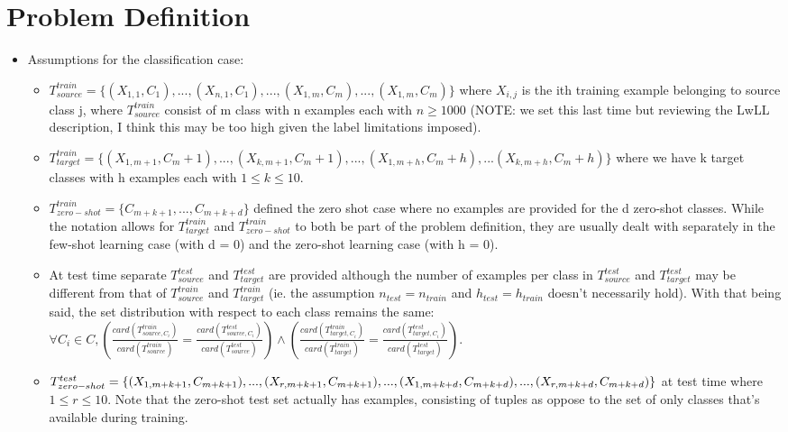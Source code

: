\documentclass{article}
\begin{document}
\section{Problem Definition}
\begin{itemize}
        \item Assumptions for the classification case:
        \begin{itemize}
            \item $T_{source}^{train} = \{ (X_{1,1}, C_1), ... , (X_{n,1}, C_1), ... ,(X_{1,m}, C_m) , ... ,(X_{1,m}, C_m)\}$ where $X_{i,j}$ is the ith training example belonging to source class j, where $T_{source}^{train}$ consist of m class with n examples each with $n \ge 1000$ (NOTE: we set this last time but reviewing the LwLL description, I think this may be too high given the label limitations imposed).
            \item $T_{target}^{train} = \{ (X_{1,m+1}, C_m+1),...,(X_{k,m+1}, C_m+1), ..., (X_{1,m+h}, C_m+h),...(X_{k,m+h}, C_m+h) \}$ where we have k target classes with h examples each with $1 \leq k \leq 10$.
            \item $T_{zero-shot}^{train} = \{ C_{m+k+1}, ..., C_{m+k+d} \}$ defined the zero shot case where no examples are provided for the d zero-shot classes. While the notation allows for $T_{target}^{train}$ and $T_{zero-shot}^{train}$ to both be part of the problem definition, they are usually dealt with separately in the few-shot learning case (with d = 0) and the zero-shot learning case (with h = 0).
            \item At test time separate $T_{source}^{test}$ and  $T_{target}^{test}$ are provided although the number of examples per class in $T_{source}^{test}$ and $T_{target}^{test}$ may be different from that of $T_{source}^{train}$ and $T_{target}^{train}$ (ie. the assumption $n_{test} = n_{train}$ and $h_{test} = h_{train}$ doesn't necessarily hold). With that being said, the set distribution with respect to each class remains the same: $\forall C_i \in C, (\frac{card(T_{source,C_i}^{train})} {card(T_{source}^{train})} = \frac{card(T_{source,C_i}^{test})} {card(T_{source}^{test})}) \land (\frac{card(T_{target,C_i}^{train})} {card(T_{target}^{train})} = \frac{card(T_{target,C_i}^{test})} {card(T_{target}^{test})})$.
            \item $T_{zero-shot}^{test} = \{ (X_{1,m+k+1}, C_{m+k+1}) , ... , (X_{r,m+k+1}, C_{m+k+1}) , ... ,  (X_{1, m+k+d}, C_{m+k+d}) , ... , \\(X_{r, m+k+d}, C_{m+k+d}) \}$ at test time where $ 1 \le r \le 10$. Note that the zero-shot test set actually has examples, consisting of tuples as oppose to the set of only classes that's available during training.

\end{itemize}
\end{itemize}
\end{document}
